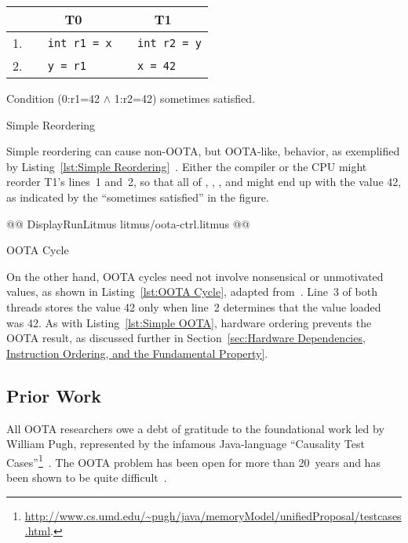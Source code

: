 \begin{listing}[bp]
{
\small
\begin{tabular}{r|l|l}
& \multicolumn{1}{c}{T0} & \multicolumn{1}{c}{T1} \\
\hline
1. &
\texttt{~~int r1 = x} &
	\texttt{~~int r2 = y} \\
2. &
\texttt{~~y = r1} &
	\texttt{~~x = 42} \\
\end{tabular}

\vspace{0.1in}
Condition (0:r1=42 $\wedge$ 1:r2=42)
sometimes satisfied.
}
\caption{Simple Reordering}
\label{lst:Simple Reordering}
\end{listing}

Simple reordering can cause non-OOTA, but OOTA-like, behavior, as
exemplified by
Listing~\ref{lst:Simple Reordering}~\cite{PaulEMcKenney2014OOTA}.
Either the compiler or the CPU might reorder T1's lines~1 and~2, so that
all of , , , and  might end up with the value 42,
as indicated by the ``sometimes satisfied'' in the figure.

\begin{listing}[tbp]
@@ DisplayRunLitmus litmus/oota-ctrl.litmus @@
\caption{OOTA Cycle}
\label{lst:OOTA Cycle}
\end{listing}

On the other hand, OOTA cycles need not involve nonsensical or
unmotivated values, as shown in
Listing~\ref{lst:OOTA Cycle}, adapted from~\cite{PaulEMcKenney2014OOTA}.
Line~3 of both threads stores the value 42 only when line~2 determines
that the value loaded was 42.
As with Listing~\ref{lst:Simple OOTA}, hardware ordering prevents the
OOTA result, as discussed further in
Section~\ref{sec:Hardware Dependencies, Instruction Ordering, and the Fundamental Property}.

\subsection{Prior Work}
\label{sec:Prior Work}

All OOTA researchers owe a debt of gratitude to the foundational work led
by William Pugh, represented by the infamous Java-language
``Causality Test Cases''\footnote{
	\url{http://www.cs.umd.edu/~pugh/java/memoryModel/unifiedProposal/testcases.html}.}~\cite{JeremyManson2005JavaMemoryModel}.
The OOTA problem has been open for more than 20~years and has been shown
to be quite difficult~\cite{MarkBatty2015OOTAisHard,PaulEMcKenney2023P3046R2/OOTAwithoutTrying}.

